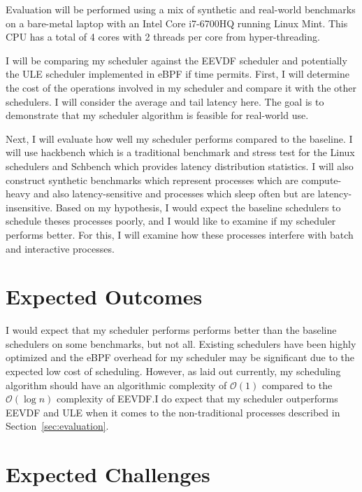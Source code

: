 \documentclass[letterpaper,twocolumn,10pt]{article}
\begin{document}
Evaluation will be performed using a mix of synthetic and real-world benchmarks
on a bare-metal laptop with an Intel Core i7-6700HQ running Linux Mint. This
CPU has a total of 4 cores with 2 threads per core from hyper-threading.

I will be comparing my scheduler against the EEVDF scheduler and potentially the
ULE scheduler implemented in eBPF if time permits. First, I will determine the
cost of the operations involved in my scheduler and compare it with the other
schedulers. I will consider the average and tail latency here. The goal is to 
demonstrate that my scheduler algorithm is feasible for real-world use. 

Next, I will evaluate how well my scheduler performs compared to the baseline.
I will use hackbench which is a traditional benchmark and stress test for
the Linux schedulers and Schbench which provides latency distribution
statistics. I will also construct synthetic benchmarks which represent
processes which are compute-heavy and also latency-sensitive and processes
which sleep often but are latency-insensitive. Based on my hypothesis,
I would expect the baseline schedulers to schedule theses processes poorly, and
I would like to examine if my scheduler performs better. For this, I will examine
how these processes interfere with batch and interactive processes. 

\section{Expected Outcomes}

I would expect that my scheduler performs performs better than the baseline
schedulers on some benchmarks, but not all. Existing schedulers have been
highly optimized and the eBPF overhead for my scheduler may be significant
due to the expected low cost of scheduling. However, as laid out currently,
my scheduling algorithm should have an algorithmic complexity of
\(\mathcal{O}(1)\) compared to the \(\mathcal{O}(\log n)\) complexity of
EEVDF.\@ I do expect that my scheduler outperforms EEVDF and ULE when it
comes to the non-traditional processes described in Section~\ref{sec:evaluation}.

\section{Expected Challenges}
\end{document}
